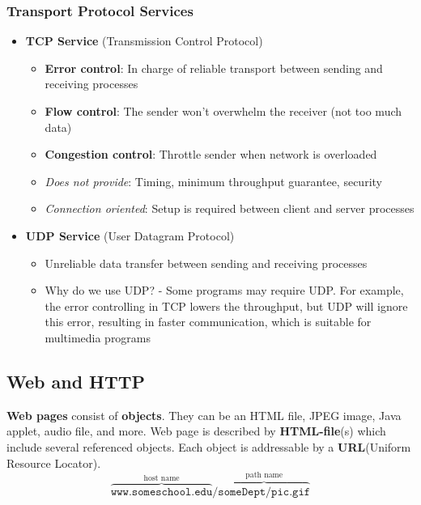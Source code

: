 \subsubsection{Transport Protocol Services}
\begin{itemize}
	\item \textbf{TCP Service} (Transmission Control Protocol)
	\begin{itemize}
		\item \textbf{Error control}: In charge of reliable transport between sending and receiving processes
		\item \textbf{Flow control}: The sender won't overwhelm the receiver (not too much data)
		\item \textbf{Congestion control}: Throttle sender when network is overloaded
		\item \textit{Does not provide}: Timing, minimum throughput guarantee, security
		\item \textit{Connection oriented}: Setup is required between client and server processes
	\end{itemize}
	\item \textbf{UDP Service} (User Datagram Protocol)
	\begin{itemize}
		\item Unreliable data transfer between sending and receiving processes
		\item Why do we use UDP? - Some programs may require UDP. For example, the error controlling in TCP lowers the throughput, but UDP will ignore this error, resulting in faster communication, which is suitable for multimedia programs
	\end{itemize}
\end{itemize}

\subsection{Web and HTTP}
\textbf{Web pages} consist of \textbf{objects}. They can be an HTML file, JPEG image, Java applet, audio file, and more. Web page is described by \textbf{HTML-file}(s) which include several referenced objects. Each object is addressable by a \textbf{URL}(Uniform Resource Locator).
$$\overbrace{\texttt{www.someschool.edu}}^{\text{host name}}/\overbrace{\texttt{someDept/pic.gif}}^{\text{path name}}$$

